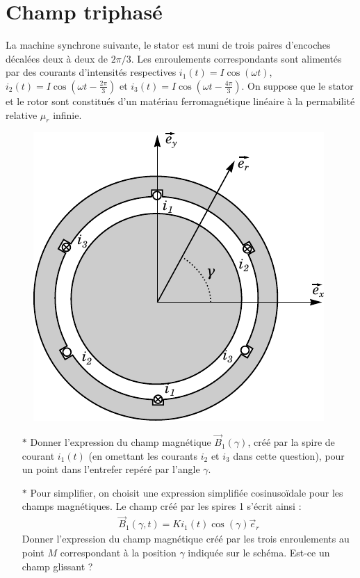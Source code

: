 \documentclass{report}
\begin{document}
\newpage

\section*{Champ triphasé}

La machine synchrone suivante, le stator est muni de trois paires d'encoches décalées deux à deux de $2\pi/3$. Les enroulements correspondants sont alimentés par des courants d'intensités respectives $i_1(t)=I\cos\left(\omega t \right)$, $i_2(t)=I\cos\left(\omega t -\frac{2\pi}{3}\right)$ et $i_3(t)=I\cos\left(\omega t -\frac{4\pi}{3}\right)$. On suppose que le stator et le rotor sont constitués d'un matériau ferromagnétique linéaire à la permabilité relative $\mu_r$ infinie.
	
	\begin{figure}[h!]
	\centering
		\includegraphics[scale=0.9]{machine_synchrone.pdf}
	\end{figure}	

\begin{itemize}

	\item[$\ast$] Donner l'expression du champ magnétique $\vec{B}_1(\gamma)$, créé par la spire de courant $i_1(t)$ (en omettant les courants $i_2$ et $i_3$ dans cette question), pour un point dans l'entrefer repéré par l'angle $\gamma$.
	
	\item[$\ast$] Pour simplifier, on choisit une expression simplifiée cosinusoïdale pour les champs magnétiques. Le champ créé par les spires 1 s'écrit ainsi :
	\begin{align*}
		\vec{B}_1(\gamma,t)=Ki_1(t)\cos(\gamma)\vec{e}_r
	\end{align*}
	Donner l'expression du champ magnétique créé par les trois enroulements au point $M$ correspondant à la position $\gamma$ indiquée sur le schéma. Est-ce un champ glissant ? 


\end{itemize}
\end{document}
